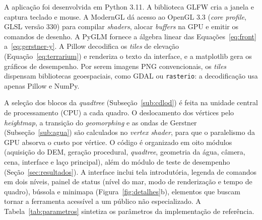 \documentclass[conference]{IEEEtran}
\begin{document}
A aplicação foi desenvolvida em Python 3.11. A biblioteca GLFW cria a janela
e captura teclado e mouse. A ModernGL dá acesso ao OpenGL 3.3 (\emph{core
profile}, GLSL versão 330) para compilar \emph{shaders}, alocar \emph{buffers}
na GPU e emitir os comandos de desenho. A PyGLM fornece a álgebra linear das
Equações~\eqref{eq:front} a~\eqref{eq:gerstner-y}. A Pillow decodifica os
\emph{tiles} de elevação (Equação~\eqref{eq:terrarium}) e renderiza o texto da
interface, e a matplotlib gera os gráficos de desempenho. Por serem imagens
PNG convencionais, os \emph{tiles} dispensam bibliotecas geoespaciais, como
GDAL ou \texttt{rasterio}: a decodificação usa apenas Pillow e NumPy.

A seleção dos blocos da \emph{quadtree} (Subseção~\ref{sub:cdlod}) é feita
na unidade central de processamento (CPU) a cada quadro. O deslocamento dos
vértices pelo \emph{heightmap}, a transição do \emph{geomorphing} e as ondas
de Gerstner (Subseção~\ref{sub:agua}) são calculados no \emph{vertex shader},
para que o paralelismo da GPU absorva o custo por vértice. O código é
organizado em oito módulos (aquisição do DEM, geração procedural,
\emph{quadtree}, geometria da água, câmera, cena, interface e laço
principal), além do módulo de teste de desempenho
(Seção~\ref{sec:resultados}). A interface inclui tela introdutória, legenda
de comandos em dois níveis, painel de status (nível do mar, modo de
renderização e tempo de quadro), bússola e minimapa (Figura~\ref{fig:detalhes}b), elementos que buscam
tornar a ferramenta acessível a um público não especializado. A
Tabela~\ref{tab:parametros} sintetiza os parâmetros da implementação de
referência.
\end{document}
